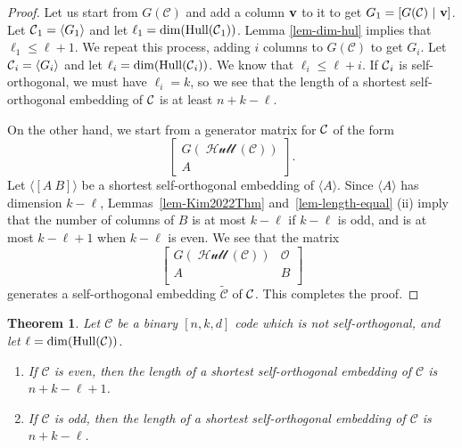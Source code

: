 \documentclass{article}
\newtheorem{theorem}{Theorem}[section]
\theoremstyle{definition}
\theoremstyle{remark}
\newcommand{\C}{\mbox{$\cal C$}}
\newcommand{\Hull}{\operatorname{Hull}}
\begin{document}
\begin{proof}
Let us start from $G(\mathcal C)$ and add a column ${\bf{v}}$ to it to get $G_1 = [G(\mathcal C) ~|~{\bf{v}}]$. Let $\C_1 = \langle G_1 \rangle$ and let $\ell_1 = \dim(\Hull(\C_1))$.  Lemma \ref{lem-dim-hul} implies that $\ell_1 \le \ell+1$.  We repeat this process, adding $i$ columns to $G(\mathcal{C})$ to get $G_i$.  Let $\C_i = \langle G_i \rangle$ and let $\ell_i = \dim(\Hull(\C_i))$.  We know that $\ell_i \le \ell + i$.  If $\C_i$ is self-orthogonal, we must have $\ell_i = k$, so we see that the length of a shortest self-orthogonal embedding of $\C$ is at least $n+k-\ell$.

On the other hand, we start from a generator matrix for $\C$ of the form
\[
\begin{bmatrix}
G(\mathcal {\operatorname{Hull}}(\mathcal C)) \\ A
\end{bmatrix}.
\]
Let $\langle[ A ~ B]\rangle$ be a shortest self-orthogonal embedding of $\langle A \rangle$.  Since $\langle A\rangle$ has dimension $k-\ell$, Lemmas~\ref{lem-Kim2022Thm} and~\ref{lem-length-equal} (ii) imply that the number of columns of $B$ is at most $k-\ell$ if $k-\ell$ is odd, and is at most $k-\ell+1$ when $k-\ell$ is even.  We see that the matrix
\[
\begin{bmatrix}
G(\mathcal {\operatorname{Hull}}(\mathcal C)) & \mathcal{O} \\
A  & B \\
\end{bmatrix}
\]
generates a self-orthogonal embedding $\tilde{\mathcal{C}}$ of $\C$. This completes the proof.
\end{proof}

\begin{theorem} \label{thm-even-odd-even}
Let $\mathcal C$ be a binary $[n, k, d]$ code which is not self-orthogonal, and let $\ell =\dim({\rm{Hull}}(\mathcal C))$.
\begin{enumerate}
    \item[(i)] If $\mathcal{C}$ is even, then the length of a shortest self-orthogonal embedding of $\mathcal{C}$ is $n+k-\ell+1$.
    \item[(ii)] If $\mathcal{C}$ is odd, then the length of a shortest self-orthogonal embedding of $\mathcal{C}$ is $n+k-\ell$.
\end{enumerate}
\end{theorem}
\end{document}

